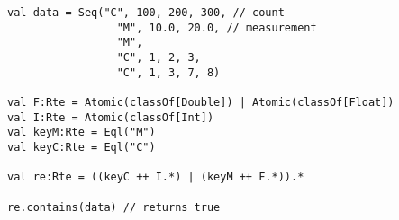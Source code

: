 \begin{lstlisting}[style=scalaioScala]
val data = Seq("C", 100, 200, 300, // count
                 "M", 10.0, 20.0, // measurement
                 "M",
                 "C", 1, 2, 3,
                 "C", 1, 3, 7, 8)

val F:Rte = Atomic(classOf[Double]) | Atomic(classOf[Float])
val I:Rte = Atomic(classOf[Int])
val keyM:Rte = Eql("M")
val keyC:Rte = Eql("C")

val re:Rte = ((keyC ++ I.*) | (keyM ++ F.*)).*

re.contains(data) // returns true
\end{lstlisting}

